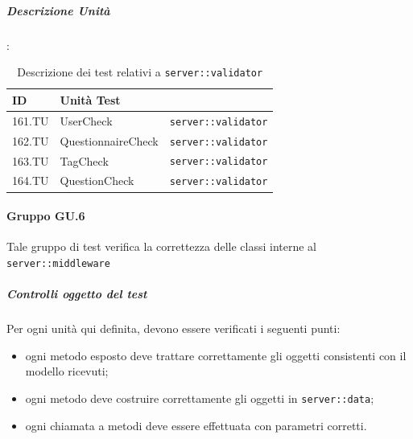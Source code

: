 \documentclass[12pt,a4paper]{article}
\begin{document}
	\subparagraph{Descrizione Unità}:
	\begin{table}[H]
		\begin{center}
			\begin{tabular}{p{} p{0.4\textwidth} p{}}
				\toprule
				\textbf{ID}   & \textbf{Unità Test}	& \textbf{\mgls{package}} \\ \midrule
				\midrule
				161.TU & UserCheck & \texttt{server::validator}\\ \midrule
				162.TU & QuestionnaireCheck & \texttt{server::validator}\\ \midrule
				163.TU & TagCheck & \texttt{server::validator}\\ \midrule
				164.TU & QuestionCheck & \texttt{server::validator}\\ \midrule			
				\bottomrule
			\end{tabular}
		\end{center}
		\caption{Descrizione dei test relativi a \texttt{server::validator}}
	\end{table}
	
	\paragraph{Gruppo GU.6}
	Tale gruppo di test verifica la correttezza delle classi interne al  \texttt{server::middleware}
	
	\subparagraph{Controlli oggetto del test}
	Per ogni unità  qui definita, devono essere verificati i seguenti punti:
	
	\begin{itemize}
		\item ogni metodo esposto deve trattare correttamente gli oggetti consistenti con il modello ricevuti;
		\item ogni metodo deve costruire correttamente gli oggetti in \texttt{server::data};
		\item ogni chiamata a metodi deve essere effettuata con parametri corretti.
	\end{itemize}
	
\end{document}
